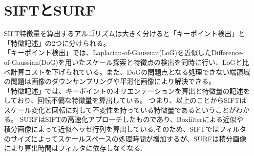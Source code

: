 \section{SIFTとSURF}
SIFT特徴量を算出するアルゴリズムは大きく分けると「キーポイント検出」と「特徴記述」の2つに分けられる。\\
「キーポイント検出」では、Laplacian-of-Gaussian(LoG)を近似したDifference-of-Gaussian(DoG)を用いたスケール探索と特徴点の検出を同時に行い、LoGと比べ計算コストを下げられている。また、DoGの問題点となる処理できない端領域の問題は画像のダウンサンプリングや平滑化画像により解決できる。\\
「特徴記述」では、キーポイントのオリエンテーションを算出と特徴量の記述をしており、回転不偏な特徴量を算出している。
つまり、以上のことからSIFTはスケール変化と回転に対して不変性を持っている特徴量であるということがわかる。
SURFはSIFTの高速化アプローチしたものであり、Boxfilterによる近似や積分画像によって近似ヘッセ行列を算出している.そのため、SIFTではフィルタのサイズによってスケールスペースの処理時間が増加するが、SURFは積分画像により算出時間はフィルタに依存しなくなる.	